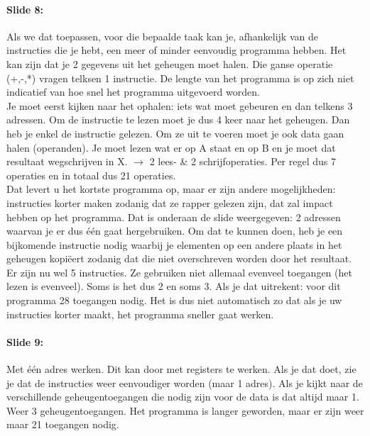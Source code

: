 \documentclass[10pt,a4paper]{book}
\begin{document}
\paragraph{Slide 8:} Als we dat toepassen, voor die bepaalde taak kan je, afhankelijk van de instructies die je hebt, een meer of minder eenvoudig programma hebben. Het kan zijn dat je 2 gegevens uit het geheugen moet halen. Die ganse operatie (+,-,*) vragen telksen 1 instructie. De lengte van het programma is op zich niet indicatief van hoe snel het programma uitgevoerd worden.\\
Je moet eerst kijken naar het ophalen: iets wat moet gebeuren en dan telkens 3 adressen. Om de instructie te lezen moet je dus 4 keer naar het geheugen. Dan heb je enkel de instructie gelezen. Om ze uit te voeren moet je ook data gaan halen (operanden). Je moet lezen wat er op A staat en op B en je moet dat resultaat wegschrijven in X. $\rightarrow$ 2 lees- \& 2 schrijfoperaties. Per regel dus 7 operaties en in totaal dus 21 operaties.\\
Dat levert u het kortste programma op, maar er zijn andere mogelijkheden: instructies korter maken zodanig dat ze rapper gelezen zijn, dat zal impact hebben op het programma. Dat is onderaan de slide weergegeven: 2 adressen waarvan je er dus \'e\'en gaat hergebruiken. Om dat te kunnen doen, heb je een bijkomende instructie nodig waarbij je elementen op een andere plaats in het geheugen kopi\"eert zodanig dat die niet overschreven worden door het resultaat.\\
Er zijn nu wel 5 instructies. Ze gebruiken niet allemaal evenveel toegangen (het lezen is evenveel). Soms is het dus 2 en soms 3. Als je dat uitrekent: voor dit programma 28 toegangen nodig. Het is dus niet automatisch zo dat als je uw instructies korter maakt, het programma sneller gaat werken. 

\paragraph{Slide 9:} Met \'e\'en adres werken. Dit kan door met registers te werken. Als je dat doet, zie je dat de instructies weer eenvoudiger worden (maar 1 adres). Als je kijkt naar de verschillende geheugentoegangen die nodig zijn voor de data is dat altijd maar 1. Weer 3 geheugentoegangen. Het programma is langer geworden, maar er zijn weer maar 21 toegangen nodig.
\end{document}
